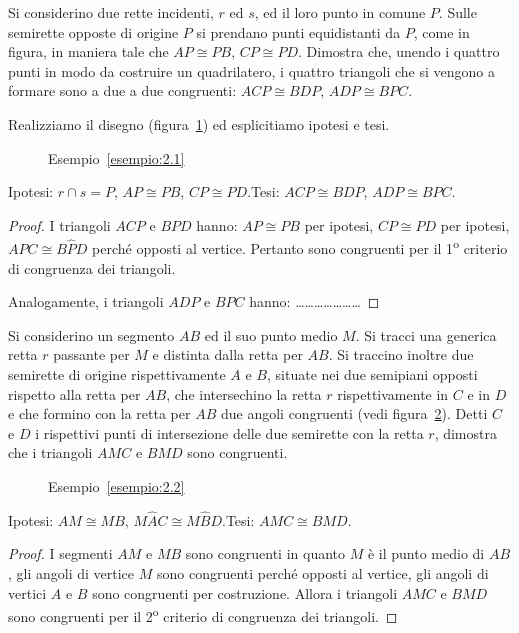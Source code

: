 \begin{exrig}
\begin{esempio}\label{esempio:2.1}
Si considerino due rette incidenti, $r$ ed $s$, ed il loro punto in comune $P$. Sulle semirette opposte di origine $P$ si prendano punti equidistanti da $P$, come in figura, in maniera tale che $AP\cong PB$, $CP\cong PD$. Dimostra che, unendo i quattro punti in modo da costruire un quadrilatero, i quattro triangoli che si vengono a formare sono a due a due congruenti: $ACP\cong BDP$, $ADP\cong BPC$.

Realizziamo il disegno (figura~\ref{fig:esempio2.1}) ed esplicitiamo ipotesi e tesi.

\begin{figure}[htb]
\centering
\caption{Esempio~\ref{esempio:2.1}}\label{fig:esempio2.1}
\end{figure}

\noindent Ipotesi: $r\cap s=P$, $AP\cong PB$, $CP\cong PD$.\tab\tab Tesi: $ACP\cong BDP$, $ADP\cong BPC$.

\begin{proof}
I triangoli $ACP$ e $BPD$ hanno: $AP\cong PB$ per ipotesi, $CP\cong PD$ per ipotesi, $A\widehat{P}C\cong B\widehat{P}D$ perché opposti al vertice. Pertanto sono congruenti per il 1\textsuperscript{o} criterio di congruenza dei triangoli.

Analogamente, i triangoli $ADP$ e $BPC$ hanno: \ldots\ldots\ldots\ldots\ldots\ldots\ldots
\end{proof}
\end{esempio}

\begin{esempio}\label{esempio:2.2}
Si considerino un segmento $AB$ ed il suo punto medio $M$. Si tracci una generica retta $r$ passante per $M$ e distinta dalla retta per $AB$. Si traccino inoltre due semirette di origine rispettivamente $A$ e $B$, situate nei due semipiani opposti rispetto alla retta per $AB$, che intersechino la retta $r$ rispettivamente in $C$ e in $D$ e che formino con la retta per $AB$ due angoli congruenti (vedi figura~\ref{fig:esempio2.2}). Detti $C$ e $D$ i rispettivi punti di intersezione delle due semirette con la retta $r$, dimostra che i triangoli $AMC$ e $BMD$ sono congruenti.

\begin{figure}[htb]
\centering
\caption{Esempio~\ref{esempio:2.2}}\label{fig:esempio2.2}
\end{figure}

\noindent Ipotesi: $AM\cong MB$, $M\widehat{A}C\cong M\widehat{B}D$.\tab Tesi: $AMC\cong BMD$.

\begin{proof}
I segmenti $AM$ e $MB$ sono congruenti in quanto $M$ è il punto medio di $AB$, gli angoli di vertice $M$ sono congruenti perché opposti al vertice, gli angoli di vertici $A$ e $B$ sono congruenti per costruzione. Allora i triangoli $AMC$ e $BMD$ sono congruenti per il 2\textsuperscript{o} criterio di congruenza dei triangoli.
\end{proof}
\end{esempio}
\end{exrig}


